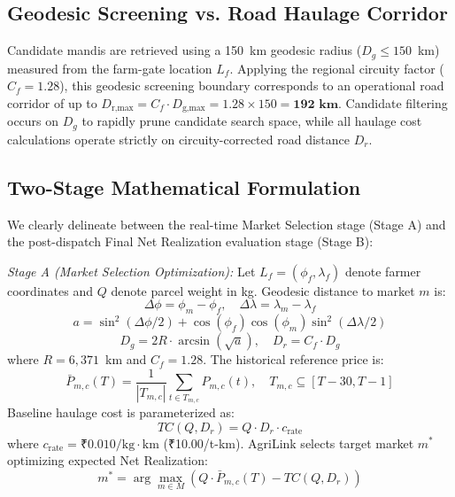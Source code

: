 \documentclass[journal]{IEEEtran}
\begin{document}
\subsection{Geodesic Screening vs. Road Haulage Corridor}
Candidate mandis are retrieved using a 150~km geodesic radius ($D_g \le 150$~km) measured from the farm-gate location $L_f$. Applying the regional circuity factor ($C_f = 1.28$), this geodesic screening boundary corresponds to an operational road corridor of up to $D_{\text{r,max}} = C_f \cdot D_{\text{g,max}} = 1.28 \times 150 = \mathbf{192\text{ km}}$. Candidate filtering occurs on $D_g$ to rapidly prune candidate search space, while all haulage cost calculations operate strictly on circuity-corrected road distance $D_r$.

\subsection{Two-Stage Mathematical Formulation}
We clearly delineate between the real-time Market Selection stage (Stage A) and the post-dispatch Final Net Realization evaluation stage (Stage B):

\textit{Stage A (Market Selection Optimization):} Let $L_f = (\phi_f, \lambda_f)$ denote farmer coordinates and $Q$ denote parcel weight in kg. Geodesic distance to market $m$ is:
\begin{equation}
\Delta\phi = \phi_m - \phi_f, \quad \Delta\lambda = \lambda_m - \lambda_f
\end{equation}
\begin{equation}
a = \sin^2(\Delta\phi/2) + \cos(\phi_f)\cos(\phi_m)\sin^2(\Delta\lambda/2)
\end{equation}
\begin{equation}
D_g = 2R \cdot \arcsin(\sqrt{a}), \quad D_r = C_f \cdot D_g
\end{equation}
where $R = 6,371$~km and $C_f = 1.28$. The historical reference price is:
\begin{equation}
\bar{P}_{m,c}(T) = \frac{1}{|T_{m,c}|} \sum_{t \in T_{m,c}} P_{m,c}(t), \quad T_{m,c} \subseteq [T-30, T-1]
\end{equation}
Baseline haulage cost is parameterized as:
\begin{equation}
TC(Q, D_r) = Q \cdot D_r \cdot c_{\text{rate}}
\end{equation}
where $c_{\text{rate}} = \text{₹}0.010/\text{kg}\cdot\text{km}$ (₹10.00/t-km). AgriLink selects target market $m^*$ optimizing expected Net Realization:
\begin{equation}
m^* = \arg\max_{m \in M} \left( Q \cdot \bar{P}_{m,c}(T) - TC(Q, D_r) \right)
\end{equation}
\end{document}
